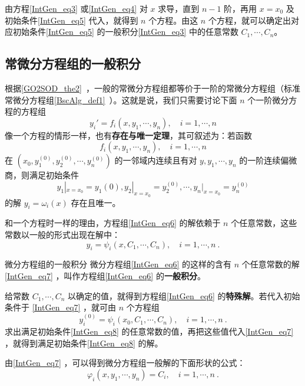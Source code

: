 由方程\autoref{IntGen_eq3} 或\autoref{IntGen_eq4} 对 $x$ 求导，直到 $n-1$ 阶，再用 $x=x_0$ 及初始条件\autoref{IntGen_eq5} 代入，就得到 $n$ 个方程。由这 $n$ 个方程，就可以确定出对应初始条件\autoref{IntGen_eq5} 的一般积分\autoref{IntGen_eq3} 中的任意常数 $C_1,\cdots,C_n$。
\subsection{常微分方程组的一般积分}
根据\autoref{GO2SOD_the2}~，一般的常微分方程组都等价于一阶的常微分方程组（标准常微分方程组\autoref{BscAlg_def1}~）。这就是说，我们只需要讨论下面 $n$ 个一阶微分方程的方程组
\begin{equation}\label{IntGen_eq6}
y_i'=f_i(x,y_1,\cdots,y_n),\quad i=1,\cdots,n
\end{equation}
像一个方程的情形一样，也有\textbf{存在与唯一定理}，其可叙述为：若函数
\begin{equation}
f_i(x,y_1,\cdots,y_n),\quad i=1,\cdots,n
\end{equation}
在 $(x_0,y_1^{(0)},y_2^{(0)},\cdots,y_n^{(0)})$ 的一邻域内连续且有对 $y,y_1,\cdots,y_n$ 的一阶连续偏微商，则满足初始条件
\begin{equation}\label{IntGen_eq8}
y_1|_{x=x_0}=y_1{(0)},y_2|_{x=x_0}=y_2^{(0)},\cdots,y_n|_{x=x_0}=y_n^{(0)}
\end{equation}
的解 $y_i=\omega_i(x)$ 存在且唯一。

和一个方程时一样的理由，方程组\autoref{IntGen_eq6} 的解依赖于 $n$ 个任意常数，这些常数以一般的形式出现在解中：
\begin{equation}\label{IntGen_eq7}
y_i=\psi_i(x,C_1,\cdots,C_n),\quad i=1,\cdots,n~.
\end{equation}
\begin{definition}{微分方程组的一般积分}
微分方程组\autoref{IntGen_eq6} 的这样的含有 $n$ 个任意常数的解\autoref{IntGen_eq7} ，叫作方程组\autoref{IntGen_eq6} 的\textbf{一般积分}。
\end{definition}
给常数 $C_1,\cdots,C_n$ 以确定的值，就得到方程组\autoref{IntGen_eq6} 的\textbf{特殊解}。若代入初始条件于 \autoref{IntGen_eq7} ，就可由 $n$ 个方程组
\begin{equation}
y_i^{(0)}=\psi_i(x_0,C_1,\cdots,C_n),\quad i=1,\cdots,n~.
\end{equation}
求出满足初始条件\autoref{IntGen_eq8} 的任意常数的值，再把这些值代入\autoref{IntGen_eq7} ，就得到满足初始条件\autoref{IntGen_eq8} 的解。

由\autoref{IntGen_eq7} ，可以得到微分方程组一般解的下面形状的公式：
\begin{equation}\label{IntGen_eq9}
\varphi_i(x,y_1,\cdots,y_n)=C_i,\quad i=1,\cdots,n~.
\end{equation}

